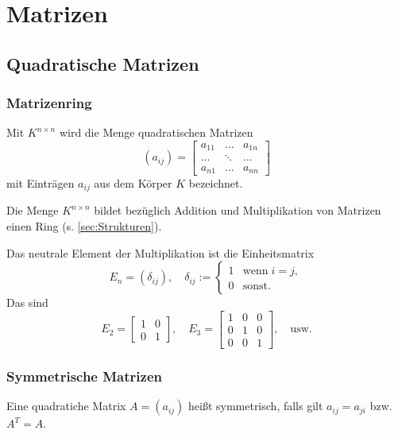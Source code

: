 \newpage
\section{Matrizen}
\subsection{Quadratische Matrizen}%
\subsubsection{Matrizenring}%
Mit $K^{n\times n}$ wird die Menge quadratischen Matrizen
\begin{equation}
(a_{ij}) = \begin{bmatrix}
a_{11} & \ldots & a_{1n}\\
\ldots & \ddots & \ldots\\
a_{n1} & \ldots & a_{nn}
\end{bmatrix}
\end{equation}
mit Einträgen $a_{ij}$ aus dem Körper $K$ bezeichnet.

Die Menge $K^{n\times n}$ bildet bezüglich Addition
und Multiplikation von Matrizen einen Ring (s. \ref{sec:Strukturen}).

Das neutrale Element der Multiplikation
ist die Einheitsmatrix
\begin{equation}
E_n = (\delta_{ij}),\quad
\delta_{ij}:=\begin{cases}
1 & \text{wenn}\;i=j,\\
0 & \text{sonst}.
\end{cases}
\end{equation}
Das sind
\begin{equation}
E_2 = \begin{bmatrix}
1 & 0\\
0 & 1
\end{bmatrix},\quad
E_3 = \begin{bmatrix}
1 & 0 & 0\\
0 & 1 & 0\\
0 & 0 & 1
\end{bmatrix},
\quad\text{usw.}
\end{equation}

\subsubsection{Symmetrische Matrizen}
Eine quadratiche Matrix $A=(a_{ij})$ heißt
symmetrisch,
falls gilt $a_{ij}=a_{ji}$ bzw. $A^T=A$.

